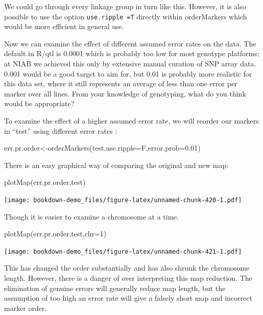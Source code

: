 \documentclass[
]{book}
\newenvironment{Shaded}{\begin{snugshade}}{\end{snugshade}}
\newcommand{\AttributeTok}[1]{\textcolor[rgb]{0.77,0.63,0.00}{#1}}
\newcommand{\DecValTok}[1]{\textcolor[rgb]{0.00,0.00,0.81}{#1}}
\newcommand{\FloatTok}[1]{\textcolor[rgb]{0.00,0.00,0.81}{#1}}
\newcommand{\FunctionTok}[1]{\textcolor[rgb]{0.00,0.00,0.00}{#1}}
\newcommand{\NormalTok}[1]{#1}
\newcommand{\OtherTok}[1]{\textcolor[rgb]{0.56,0.35,0.01}{#1}}
\begin{document}
We could go through every linkage group in turn like this. However, it is also possible to use the option \texttt{use.ripple\ =T} directly within orderMarkers which would be more efficient in general use.

Now we can examine the effect of different assumed error rates on the data. The default in R/qtl is 0.0001 which is probably too low for most genotype platforms; at NIAB we achieved this only by extensive manual curation of SNP array data. 0.001 would be a good target to aim for, but 0.01 is probably more realistic for this data set, where it still represents an average of less than one error per marker over all lines. From your knowledge of genotyping, what do you think would be appropriate?

To examine the effect of a higher assumed error rate, we will reorder our markers in ``test'' using different error rates :

\begin{Shaded}
\begin{Highlighting}[]
\NormalTok{err.pr.order}\OtherTok{\textless{}{-}}\FunctionTok{orderMarkers}\NormalTok{(test,}\AttributeTok{use.ripple=}\NormalTok{F,}\AttributeTok{error.prob=}\FloatTok{0.01}\NormalTok{)}
\end{Highlighting}
\end{Shaded}

There is an easy graphical way of comparing the original and new map:

\begin{Shaded}
\begin{Highlighting}[]
\FunctionTok{plotMap}\NormalTok{(err.pr.order,test) }
\end{Highlighting}
\end{Shaded}

\texttt{[image: bookdown-demo\_files/figure-latex/unnamed-chunk-420-1.pdf]}

Though it is easier to examine a chromosome at a time.

\begin{Shaded}
\begin{Highlighting}[]
\FunctionTok{plotMap}\NormalTok{(err.pr.order,test,}\AttributeTok{chr=}\DecValTok{1}\NormalTok{) }
\end{Highlighting}
\end{Shaded}

\texttt{[image: bookdown-demo\_files/figure-latex/unnamed-chunk-421-1.pdf]}

This has changed the order substantially and has also shrunk the chromosome length. However, there is a danger of over interpreting this map reduction. The elimination of genuine errors will generally reduce map length, but the assumption of too high an error rate will give a falsely short map and incorrect marker order.
\end{document}
